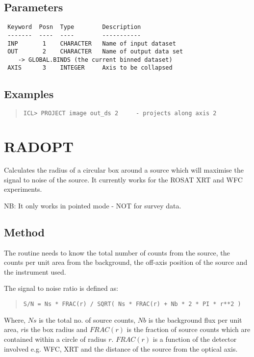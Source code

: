 \documentclass{book}
\renewcommand{\_}{{\tt\char'137}}     %
\begin{document}
\subsection{Parameters}
\begin{verbatim}
 Keyword  Posn  Type        Description
 -------  ----  ----        -----------
 INP       1    CHARACTER   Name of input dataset
 OUT       2    CHARACTER   Name of output data set
    -> GLOBAL.BINDS (the current binned dataset)
 AXIS      3    INTEGER     Axis to be collapsed

\end{verbatim}\subsection{Examples}
\begin{quote}\begin{verbatim}
ICL> PROJECT image out_ds 2     - projects along axis 2
\end{verbatim}\end{quote}
\section{RADOPT}
Calculates the radius of a circular box around a source which
will maximise the signal to noise of the source. It currently
works for the ROSAT XRT and WFC experiments.

NB: It only works in pointed mode - NOT for survey data.

\subsection{Method}
The routine needs to know the total number of counts from the
source, the counts per unit area from the background, the
off-axis position of the source and the instrument used.

The signal to noise ratio is defined as:

\begin{quote}\begin{verbatim}
S/N = Ns * FRAC(r) / SQRT( Ns * FRAC(r) + Nb * 2 * PI * r**2 )
\end{verbatim}\end{quote}
Where, $Ns$ is the total no. of source counts, $Nb$ is
the background flux per unit area, $r $is the box radius and
$FRAC(r)$ is the fraction
of source counts which are contained within a circle of radius
$r$.
$FRAC(r)$ is a function of the detector involved e.g. WFC, XRT and
the distance of the source from the optical axis.
\end{document}
